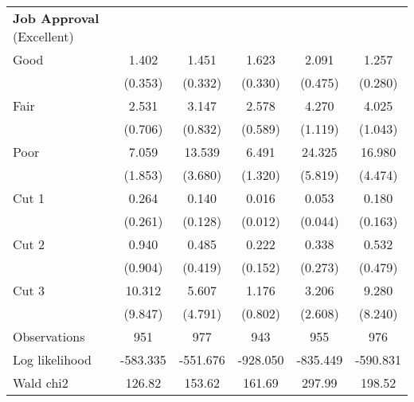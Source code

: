 \begin{table}[htbp]
\begin{tabular}{l*{5}{c}}
\textbf{Job Approval} (Excellent) &  &  &  &   & \\
Good                &       1.402         &       1.451         &       1.623\sym{**} &       2.091\sym{***}&       1.257         \\
                    &     (0.353)         &     (0.332)         &     (0.330)         &     (0.475)         &     (0.280)         \\
Fair                &       2.531\sym{***}&       3.147\sym{***}&       2.578\sym{***}&       4.270\sym{***}&       4.025\sym{***}\\
                    &     (0.706)         &     (0.832)         &     (0.589)         &     (1.119)         &     (1.043)         \\
Poor                &       7.059\sym{***}&      13.539\sym{***}&       6.491\sym{***}&      24.325\sym{***}&      16.980\sym{***}\\
                    &     (1.853)         &     (3.680)         &     (1.320)         &     (5.819)         &     (4.474)         \\
Cut 1               &       0.264         &       0.140\sym{**} &       0.016\sym{***}&       0.053\sym{***}&       0.180\sym{*}  \\
                    &     (0.261)         &     (0.128)         &     (0.012)         &     (0.044)         &     (0.163)         \\
Cut 2               &       0.940         &       0.485         &       0.222\sym{**} &       0.338         &       0.532         \\
                    &     (0.904)         &     (0.419)         &     (0.152)         &     (0.273)         &     (0.479)         \\
Cut 3               &      10.312\sym{**} &       5.607\sym{**} &       1.176         &       3.206         &       9.280\sym{**} \\
                    &     (9.847)         &     (4.791)         &     (0.802)         &     (2.608)         &     (8.240)         \\
\hline
Observations        &         951         &         977         &         943         &         955         &         976         \\
Log likelihood      &    -583.335         &    -551.676         &    -928.050         &    -835.449         &    -590.831         \\
Wald chi2           &      126.82         &      153.62         &      161.69         &      297.99         &      198.52         \\

\end{tabular}
\end{table}
